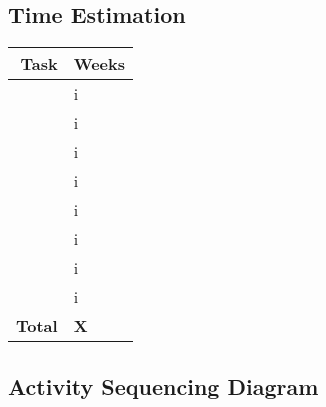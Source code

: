 \documentclass[titlepage]{article}
\begin{document}
\subsection{Time Estimation}
\begin{table}[h]
	\centering
	\begin{tabular}{ |r l| }
	\hline
	\textbf{Task} & \textbf{Weeks} \\
	\hline
	\TaAlt & i \\
	\TbAlt & i \\
	\TcAlt & i \\
	\TdAlt & i \\
	\TeAlt & i \\
	\TfAlt & i \\
	\TgAlt & i \\
	\ThAlt & i \\
	\hline
	\textbf{Total} & \textbf{X} \\
	\hline
	\end{tabular}
\end{table}

\subsection{Activity Sequencing Diagram}
\end{document}

